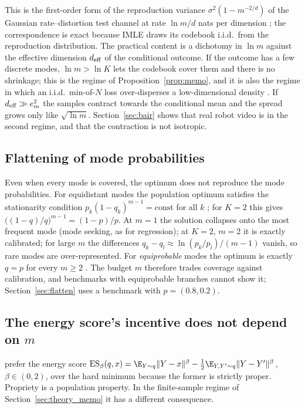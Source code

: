 This is the first-order form of the reproduction variance $\sigma^2(1 - m^{-2/d})$ of the Gaussian rate--distortion test channel at rate $\ln m / d$ nats per dimension \citep{cover2006elements}; the correspondence is exact because IMLE draws its codebook i.i.d.\ from the reproduction distribution. The practical content is a dichotomy in $\ln m$ against the effective dimension $d_{\mathrm{eff}}$ of the conditional outcome. If the outcome has a few discrete modes, $\ln m > \ln K$ lets the codebook cover them and there is no shrinkage; this is the regime of Proposition~\ref{prop:memo}, and it is also the regime in which an i.i.d.\ min-of-$N$ loss over-disperses a low-dimensional density \citep{thiede2019variety}. If $d_{\mathrm{eff}} \gg e_m^2$ the samples contract towards the conditional mean and the spread grows only like $\sqrt{\ln m}$. Section~\ref{sec:bair} shows that real robot video is in the second regime, and that the contraction is not isotropic.

\subsection{Flattening of mode probabilities}
\label{sec:theory_flatten}
Even when every mode is covered, the \nom{} optimum does not reproduce the mode probabilities. For equidistant modes the population optimum satisfies the stationarity condition $p_k (1 - q_k)^{m-1} = \mathrm{const}$ for all $k$ \citep[Theorem~7]{bennett2026freedom}; for $K = 2$ this gives $\big((1-q)/q\big)^{m-1} = (1-p)/p$. At $m = 1$ the solution collapses onto the most frequent mode (mode seeking, as for regression); at $K{=}2$, $m{=}2$ it is exactly calibrated; for large $m$ the differences $q_k - q_l \approx \ln(p_k/p_l)/(m-1)$ vanish, so rare modes are over-represented. For \emph{equiprobable} modes the optimum is exactly $q = p$ for every $m \ge 2$ \citep[Theorem~4]{bennett2026freedom}. The budget $m$ therefore trades coverage against calibration, and benchmarks with equiprobable branches cannot show it; Section~\ref{sec:flatten} uses a benchmark with $p = (0.8, 0.2)$.

\subsection{The energy score's incentive does not depend on $m$}
\label{sec:theory_es}
\citet{makabe2026esp} prefer the energy score $\IS_\beta(q, x) = \E_{Y \sim q}\|Y - x\|^\beta - \frac{1}{2}\E_{Y, Y' \sim q}\|Y - Y'\|^\beta$, $\beta \in (0, 2)$, over the hard minimum because the former is strictly proper. Propriety is a population property. In the finite-sample regime of Section~\ref{sec:theory_memo} it has a different consequence.

